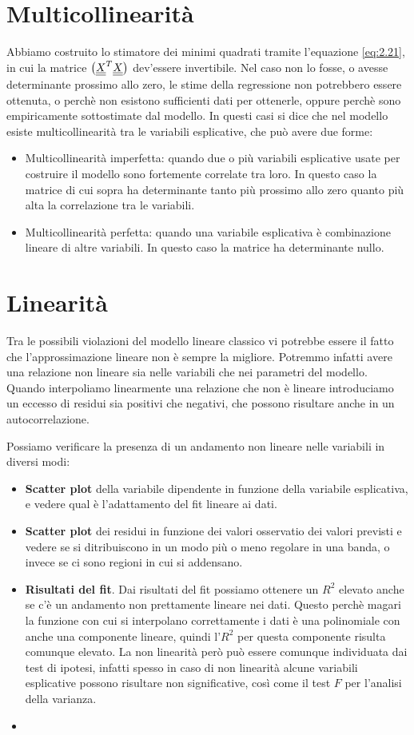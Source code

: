 \section{Multicollinearità}
Abbiamo costruito lo stimatore dei minimi quadrati tramite l'equazione \ref{eq:2.21}, in cui la matrice $ \left(\underline{\underline{X}}^T \underline{\underline{X}}\right) $ dev'essere invertibile. Nel caso non lo fosse, o avesse determinante prossimo allo zero, le stime della regressione non potrebbero essere ottenuta, o perchè non esistono sufficienti dati per ottenerle, oppure perchè sono empiricamente sottostimate dal modello. In questi casi si dice che nel modello esiste multicollinearità tra le variabili esplicative, che può avere due forme:
\begin{itemize}
	\item Multicollinearità imperfetta: quando due o più variabili esplicative usate per costruire il modello sono fortemente correlate tra loro. In questo caso la matrice di cui sopra ha determinante tanto più prossimo allo zero quanto più alta la correlazione tra le variabili.
	\item Multicollinearità perfetta: quando una variabile esplicativa è combinazione lineare di altre variabili. In questo caso la matrice ha determinante nullo.
\end{itemize}


\section{Linearità}
Tra le possibili violazioni del modello lineare classico vi potrebbe essere il fatto che l'approssimazione lineare non è sempre la migliore. Potremmo infatti avere una relazione non lineare sia nelle variabili che nei parametri del modello. Quando interpoliamo linearmente una relazione che non è lineare introduciamo un eccesso di residui sia positivi che negativi, che possono risultare anche in un autocorrelazione.

Possiamo verificare la presenza di un andamento non lineare nelle variabili in diversi modi:
\begin{itemize}
	\item \textbf{Scatter plot} della variabile dipendente in funzione della variabile esplicativa, e vedere qual è l'adattamento del fit lineare ai dati.
	\item \textbf{Scatter plot} dei residui in funzione dei valori osservatio dei valori previsti e vedere se si ditribuiscono in un modo più o meno regolare in una banda, o invece se ci sono regioni in cui si addensano.
	\item \textbf{Risultati del fit}. Dai risultati del fit possiamo ottenere un $R^2$ elevato anche se c'è un andamento non prettamente lineare nei dati. Questo perchè magari la funzione con cui si interpolano correttamente i dati è una polinomiale con anche una componente lineare, quindi l'$R^2$ per questa componente risulta comunque elevato. La non linearità però può essere comunque individuata dai test di ipotesi, infatti spesso in caso di non linearità alcune variabili esplicative possono risultare non significative, così come il test $F$ per l'analisi della varianza.
	\item 
\end{itemize}

